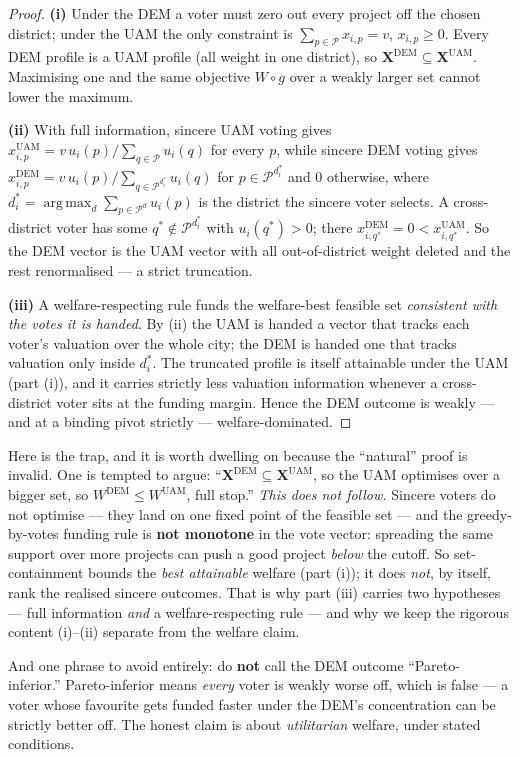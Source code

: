 \documentclass[11pt,letterpaper]{article}
\theoremstyle{definition}
\theoremstyle{plain}
\theoremstyle{remark}
\newcommand{\Pset}{\mathcal{P}}
\newcommand{\votes}{v}
\newcommand{\DEM}{\text{DEM}}
\newcommand{\UAM}{\text{UAM}}
\DeclareMathOperator*{\argmax}{arg\,max}
\begin{document}
\begin{proof}
\textbf{(i)} Under the DEM a voter must zero out every project off the chosen district; under the
UAM the only constraint is $\sum_{p\in\Pset}x_{i,p}=\votes$, $x_{i,p}\ge0$. Every DEM profile is a
UAM profile (all weight in one district), so $\mathbf{X}^{\DEM}\subseteq\mathbf{X}^{\UAM}$.
Maximising one and the same objective $W\circ g$ over a weakly larger set cannot lower the maximum.

\smallskip\noindent\textbf{(ii)} With full information, sincere UAM voting gives
$x_{i,p}^{\UAM}=\votes\,u_i(p)/\sum_{q\in\Pset}u_i(q)$ for every $p$, while sincere DEM voting gives
$x_{i,p}^{\DEM}=\votes\,u_i(p)/\sum_{q\in\Pset^{d_i^*}}u_i(q)$ for $p\in\Pset^{d_i^*}$ and $0$
otherwise, where $d_i^*=\argmax_d\sum_{p\in\Pset^d}u_i(p)$ is the district the sincere voter
selects. A cross-district voter has some $q^*\notin\Pset^{d_i^*}$ with $u_i(q^*)>0$; there
$x_{i,q^*}^{\DEM}=0<x_{i,q^*}^{\UAM}$. So the DEM vector is the UAM vector with all out-of-district
weight deleted and the rest renormalised --- a strict truncation.

\smallskip\noindent\textbf{(iii)} A welfare-respecting rule funds the welfare-best feasible set
\emph{consistent with the votes it is handed}. By (ii) the UAM is handed a vector that tracks each
voter's valuation over the whole city; the DEM is handed one that tracks valuation only inside
$d_i^*$. The truncated profile is itself attainable under the UAM (part (i)), and it carries
strictly less valuation information whenever a cross-district voter sits at the funding margin.
Hence the DEM outcome is weakly --- and at a binding pivot strictly --- welfare-dominated.
\end{proof}

\begin{watchout}
Here is the trap, and it is worth dwelling on because the ``natural'' proof is invalid.
One is tempted to argue: ``$\mathbf{X}^{\DEM}\subseteq\mathbf{X}^{\UAM}$, so the UAM optimises over a
bigger set, so $W^{\DEM}\le W^{\UAM}$, full stop.'' \emph{This does not follow.} Sincere voters do
not optimise --- they land on one fixed point of the feasible set --- and the greedy-by-votes funding
rule is \textbf{not monotone} in the vote vector: spreading the same support over more projects can
push a good project \emph{below} the cutoff. So set-containment bounds the \emph{best attainable}
welfare (part (i)); it does \emph{not}, by itself, rank the realised sincere outcomes. That is why
part (iii) carries two hypotheses --- full information \emph{and} a welfare-respecting rule --- and
why we keep the rigorous content (i)--(ii) separate from the welfare claim.

And one phrase to avoid entirely: do \textbf{not} call the DEM outcome ``Pareto-inferior.''
Pareto-inferior means \emph{every} voter is weakly worse off, which is false --- a voter whose
favourite gets funded faster under the DEM's concentration can be strictly better off. The honest
claim is about \emph{utilitarian} welfare, under stated conditions.
\end{watchout}
\end{document}
